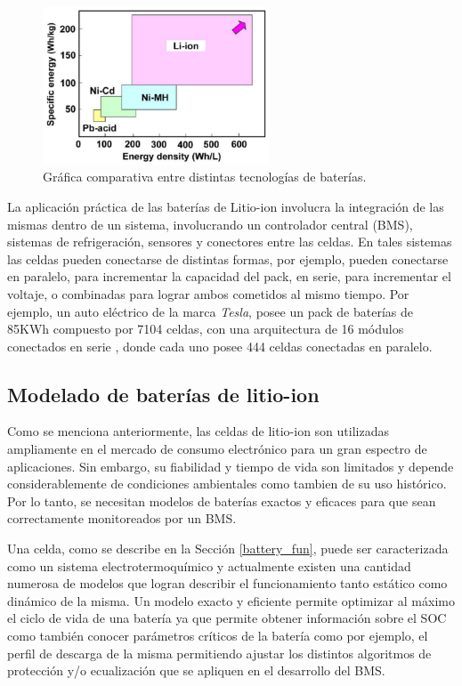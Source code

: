 \documentclass[10pt,a4paper]{article}
\begin{document}
\begin{figure}[h!]
    \begin{center}
	\includegraphics[width=0.6\textwidth]{comparisson-liion.png}
	\caption{Gr\'afica comparativa entre distintas tecnologías de baterías.}
	\label{comparisson_batt}
    \end{center}
\end{figure}

\noindent La aplicación práctica de las baterías de Litio-ion involucra la
integración de las mismas dentro de un sistema, involucrando un controlador
central (\acrshort{BMS}), sistemas de refrigeración, sensores y conectores entre
las celdas. En tales sistemas las celdas pueden conectarse de distintas formas,
por ejemplo, pueden conectarse en paralelo, para incrementar la capacidad del
pack, en serie, para incrementar el voltaje, o combinadas para lograr ambos
cometidos al mismo tiempo. Por ejemplo, un auto eléctrico de la marca
\emph{Tesla}, posee un pack de baterías de 85KWh compuesto por 7104 celdas, con
una arquitectura de 16 módulos conectados en serie , donde cada uno posee 444
celdas conectadas en paralelo.

\newpage

\subsection{Modelado de bater\'ias de litio-ion}\label{litioModel}

\noindent Como se menciona anteriormente, las celdas de litio-ion son utilizadas
ampliamente en el mercado de consumo electr\'onico para un gran espectro de 
aplicaciones. Sin embargo, su fiabilidad y tiempo de vida son limitados y 
depende considerablemente de condiciones ambientales como tambien de su uso 
hist\'orico. Por lo tanto, se necesitan modelos de bater\'ias exactos y eficaces 
para que sean correctamente monitoreados por un \acrshort{BMS}.

\noindent Una celda, como se describe en la Secci\'on \ref{battery_fun}, puede 
ser caracterizada como un sistema electrotermoqu\'imico y actualmente existen 
una cantidad numerosa de modelos que logran describir el funcionamiento tanto 
est\'atico como din\'amico de la misma. Un modelo exacto y eficiente permite 
optimizar al m\'aximo el ciclo de vida de una bater\'ia ya que permite 
obtener informaci\'on sobre el \acrshort{SOC} como tambi\'en conocer 
par\'ametros cr\'iticos de la bater\'ia como por ejemplo, el perfil de descarga 
de la misma permitiendo ajustar los distintos algoritmos de protecci\'on y/o 
ecualizaci\'on  que se apliquen en el desarrollo del \acrshort{BMS}.
\end{document}
